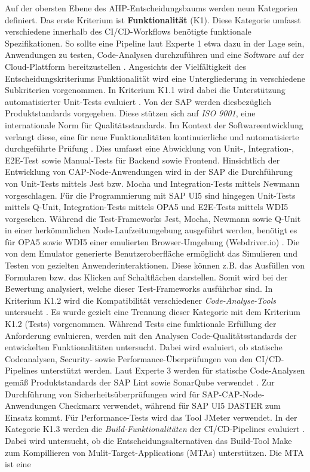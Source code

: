  Auf der obersten Ebene des AHP-Entscheidungsbaums werden neun Kategorien definiert. Das erste Kriterium ist \textbf{Funktionalität} (K1). Diese Kategorie umfasst verschiedene innerhalb des CI/CD-Workflows benötigte funktionale Spezifikationen. So sollte eine Pipeline laut Experte 1 etwa dazu in der Lage sein, Anwendungen zu testen, Code-Analysen durchzuführen und eine Software auf der Cloud-Plattform bereitzustellen \cite[Z. 52]{ProductOwnerSAPBTPProd&Infra.}. Angesichts der Vielfältigkeit des Entscheidungskriteriums Funktionalität wird eine Untergliederung in verschiedene Subkriterien vorgenommen. In Kriterium K1.1 wird dabei die Unterstützung automatisierter Unit-Tests evaluiert \cite[Z. 16]{SoftwareArchitektSAPDTSIntegration.}. Von der SAP werden diesbezüglich Produktstandards vorgegeben. Diese stützen sich auf \textit{ISO 9001}, eine internationale Norm für Qualitätsstandards. Im Kontext der Softwareentwicklung verlangt diese, eine für neue Funktionalitäten kontinuierliche und automatisierte durchgeführte Prüfung \cite[Z. 61]{TestDeveloperSAPHyperspaceAdoption&Onboarding.b}. Dies umfasst eine Abwicklung von Unit-, Integration-, E2E-Test sowie Manual-Tests für Backend sowie Frontend. Hinsichtlich der Entwicklung von CAP-Node-Anwendungen wird in der SAP die Durchführung von Unit-Tests mittels Jest bzw. Mocha und Integration-Tests mittels Newmann vorgeschlagen. Für die Programmierung mit SAP UI5 sind hingegen Unit-Tests mittels Q-Unit, Integration-Tests mittels OPA5 und E2E-Tests mittels WDI5 vorgesehen. Während die Test-Frameworks Jest, Mocha, Newmann sowie Q-Unit in einer herkömmlichen Node-Laufzeitumgebung ausgeführt werden, benötigt es für OPA5 sowie WDI5 einer emulierten Browser-Umgebung (Webdriver.io) \cite[Z. 62 ff.]{TestDeveloperSAPHyperspaceAdoption&Onboarding.b}. Die von dem Emulator generierte Benutzeroberfläche ermöglicht das Simulieren und Testen von gezielten Anwenderinteraktionen. Diese können z.B. das Ausfüllen von Formularen bzw. das Klicken auf Schaltflächen darstellen. Somit wird bei der Bewertung analysiert, welche dieser Test-Frameworks ausführbar sind. In Kriterium K1.2 wird die Kompatibilität verschiedener \textit{Code-Analyse-Tools} untersucht \cite[Z. 67 ff.]{ProductOwnerSAPBTPProd&Infra.}. Es wurde gezielt eine Trennung dieser Kategorie mit dem Kriterium K1.2 (Tests) vorgenommen. Während Tests eine funktionale Erfüllung der Anforderung evaluieren, werden  mit den Analysen Code-Qualitätsstandards der entwickelten Funktionalitäten untersucht. Dabei wird evaluiert, ob statische Codeanalysen, Security- sowie Performance-Überprüfungen von den CI/CD-Pipelines unterstützt werden. Laut Experte 3 werden für statische Code-Analysen gemäß Produktstandards der SAP Lint sowie SonarQube verwendet \cite[Z. 41]{ProductManagerSAPHyperspaceSecurityTools.}. Zur Durchführung von Sicherheitsüberprüfungen wird für SAP-CAP-Node-Anwendungen Checkmarx verwendet, während für SAP UI5 DASTER zum Einsatz kommt. Für Performance-Tests wird das Tool JMeter verwendet. In der Kategorie K1.3 werden die \textit{Build-Funktionalitäten} der CI/CD-Pipelines evaluiert \cite[Z. 67 ff.]{ProductOwnerSAPBTPProd&Infra.}. Dabei wird untersucht, ob die Entscheidungsalternativen das Build-Tool Make zum Kompillieren von Mulit-Target-Applications (\acs{MTA}s) unterstützen. Die MTA ist eine 